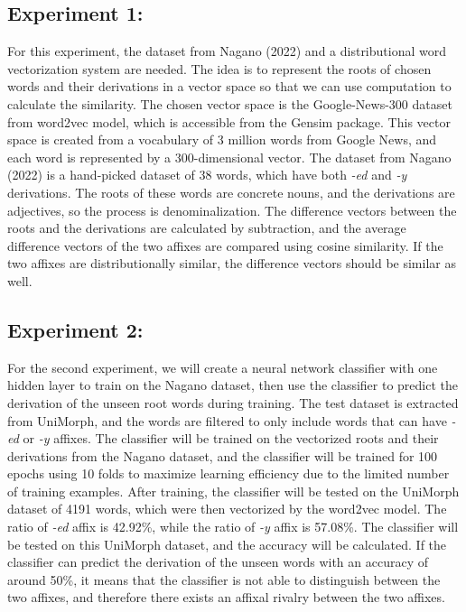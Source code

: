 \documentclass[12pt]{article}
\begin{document}
\subsection{Experiment 1:}
    For this experiment, the dataset from Nagano (2022) and a distributional word vectorization system are needed. The idea is to represent the roots of chosen words and their derivations in a vector space so that we can use computation to calculate the similarity. The chosen vector space is the Google-News-300 dataset from word2vec model, which is accessible from the Gensim package. This vector space is created from a vocabulary of 3 million words from Google News, and each word is represented by a 300-dimensional vector. The dataset from Nagano (2022) is a hand-picked dataset of 38 words, which have both \emph{-ed} and \emph{-y} derivations. The roots of these words are concrete nouns, and the derivations are adjectives, so the process is denominalization. The difference vectors between the roots and the derivations are calculated by subtraction, and the average difference vectors of the two affixes are compared using cosine similarity. If the two affixes are distributionally similar, the difference vectors should be similar as well.

\subsection{Experiment 2:}
    For the second experiment, we will create a neural network classifier with one hidden layer to train on the Nagano dataset, then use the classifier to predict the derivation of the unseen root words during training. The test dataset is extracted from UniMorph, and the words are filtered to only include words that can have \emph{-ed} or \emph{-y} affixes. The classifier will be trained on the vectorized roots and their derivations from the Nagano dataset, and the classifier will be trained for 100 epochs using 10 folds to maximize learning efficiency due to the limited number of training examples. After training, the classifier will be tested on the UniMorph dataset of 4191 words, which were then vectorized by the word2vec model. The ratio of \emph{-ed} affix is 42.92\%, while the ratio of \emph{-y} affix is 57.08\%. The classifier will be tested on this UniMorph dataset, and the accuracy will be calculated. If the classifier can predict the derivation of the unseen words with an accuracy of around 50\%, it means that the classifier is not able to distinguish between the two affixes, and therefore there exists an affixal rivalry between the two affixes.
\end{document}
